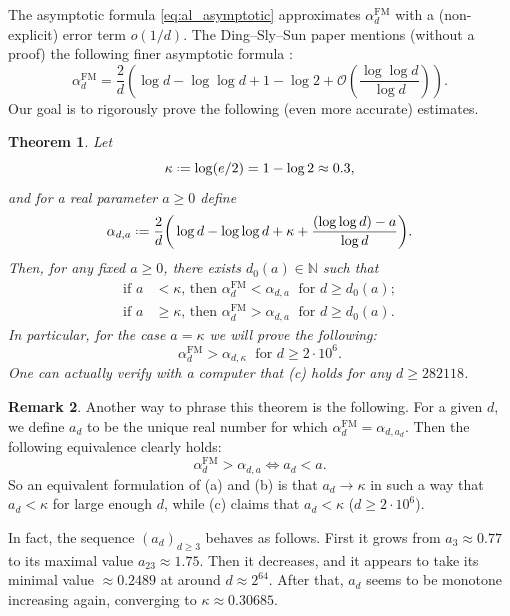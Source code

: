 \documentclass[12pt]{amsart}
\newtheorem{theorem}{Theorem}[section]
\theoremstyle{definition}
\newtheorem{remark}[theorem]{Remark}
\newcommand\Nb{\mathbb{N}}
\newcommand\Oc{\mathcal{O}}  %
\newcommand\al{\alpha}
\newcommand\ka{\kappa}
\newcommand\alfm{\alpha^{\mathrm{FM}}}
\newcommand{\defeq}{\mathrel{\vcenter{\baselineskip0.5ex \lineskiplimit0pt
                     \hbox{\scriptsize.}\hbox{\scriptsize.}}}%
                     =}
\begin{document}
The asymptotic formula \eqref{eq:al_asymptotic} approximates $\alfm_d$ with a (non-explicit) error term $o(1/d)$. The Ding--Sly--Sun paper mentions (without a proof) the following finer asymptotic formula \cite[formula (4)]{ding2016maximum}:
%
\begin{equation*} %
\alfm_d = \frac{2}{d} \left( \log d - \log \log d + 1 - \log 2 
+ \Oc\left( \frac{\log \log d}{\log d} \right) \right) .
\end{equation*}
%
Our goal is to rigorously prove the following (even more accurate) estimates. 
%
\begin{theorem} \label{thm:alfm_bnd}
Let 
%
\begin{equation*} %
\ka \defeq \log(e/2) = 1-\log 2 \approx 0.3,    
\end{equation*}
%
and for a real parameter $a \geq 0$ define 
%
\begin{equation*} %
\al_{d,a} \defeq 
\frac{2}{d}\bigg( \log d - \log\log d 
+ \ka + \frac{(\log\log d) - a}{\log d} \bigg) .
\end{equation*} 
%
Then, for any fixed $a \geq 0$, there exists $d_0(a) \in \Nb$ such that 
%
\begin{align*}
\text{if } a &< \ka 
\text{, then } \alfm_d < \al_{d,a} \;
\text{ for } d \geq d_0(a) ; \tag{a}\\
\text{if } a &\geq \ka 
\text{, then } \alfm_d > \al_{d,a} \;
\text{ for } d \geq d_0(a) \tag{b}.
\end{align*}
%
In particular, for the case $a=\ka$ we will prove the following:
%
\[ \alfm_d > \al_{d,\ka} 
\; \text{ for } d \geq 2 \cdot 10^6 . \tag{c} \]
%
One can actually verify with a computer that (c) holds for any $d \geq 282118$.
\end{theorem}
%
\begin{remark}
Another way to phrase this theorem is the following. For a given $d$, we define $a_d$ to be the unique real number for which $\alfm_d=\al_{d,a_d}$. Then the following equivalence clearly holds:
%
\[ \alfm_d > \al_{d,a} \Longleftrightarrow a_d < a .\] 
%
So an equivalent formulation of (a) and (b) is that $a_d \to \ka$ in such a way that $a_d< \ka$ for large enough $d$, while (c) claims that $a_d< \ka$ ($d \geq 2 \cdot 10^6$).

In fact, the sequence $(a_d)_{d\geq 3}$ behaves as follows. First it grows from $a_3 \approx 0.77$ to its maximal value $a_{23} \approx 1.75$. Then it decreases, and it appears to take its minimal value $\approx 0.2489$ at around $d \approx 2^{64}$. After that, $a_d$ seems to be monotone increasing again, converging to $\ka \approx 0.30685$.
\end{remark}
\end{document}

